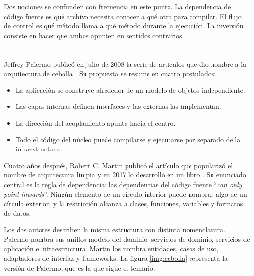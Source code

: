 \documentclass[10pt,a4paper]{article}
\begin{document}
Dos nociones se confunden con frecuencia en este punto. La dependencia de código fuente es qué archivo necesita conocer a qué otro para compilar. El flujo de control es qué método llama a qué método durante la ejecución. La inversión consiste en hacer que ambos apunten en sentidos contrarios.

\section{\color{colorIPN}{Desarrollo}}

\subsection{ \color{colorESCOM}{Origen y formulaciones}}

Jeffrey Palermo publicó en julio de 2008 la serie de artículos que dio nombre a la arquitectura de cebolla \cite{palermo2008}. Su propuesta se resume en cuatro postulados:

\begin{itemize}
	\item La aplicación se construye alrededor de un modelo de objetos independiente.
	\item Las capas internas definen interfaces y las externas las implementan.
	\item La dirección del acoplamiento apunta hacia el centro.
	\item Todo el código del núcleo puede compilarse y ejecutarse por separado de la infraestructura.
\end{itemize}

Cuatro años después, Robert C. Martin publicó el artículo que popularizó el nombre de arquitectura limpia \cite{martin2012} y en 2017 lo desarrolló en un libro \cite{martin2017}. Su enunciado central es la regla de dependencia: las dependencias del código fuente \enquote{\textit{can only point inwards}}. Ningún elemento de un círculo interior puede nombrar algo de un círculo exterior, y la restricción alcanza a clases, funciones, variables y formatos de datos.

Los dos autores describen la misma estructura con distinta nomenclatura. Palermo nombra sus anillos modelo del dominio, servicios de dominio, servicios de aplicación e infraestructura. Martin los nombra entidades, casos de uso, adaptadores de interfaz y frameworks. La figura \ref{img:cebolla} representa la versión de Palermo, que es la que sigue el temario.
\end{document}
